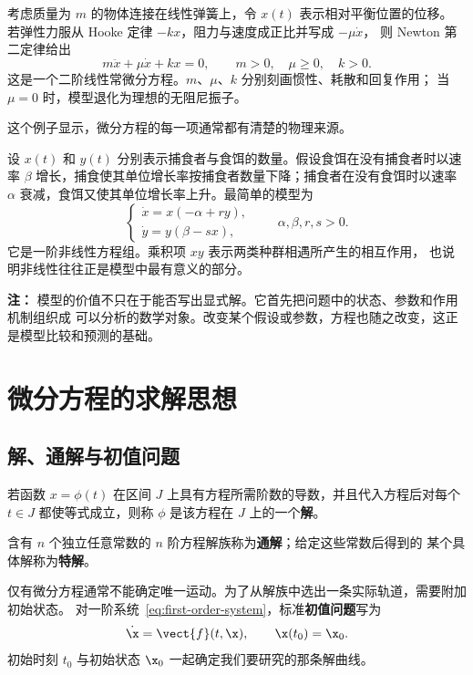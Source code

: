\begin{example}
考虑质量为 $m$ 的物体连接在线性弹簧上，令 $x(t)$ 表示相对平衡位置的位移。
若弹性力服从 Hooke 定律 $-kx$，阻力与速度成正比并写成 $-\mu\dot{x}$，
则 Newton 第二定律给出
\begin{equation}\label{eq:damped-oscillator}
	m\ddot{x}+\mu\dot{x}+kx=0,
	\qquad m>0,\quad \mu\geq 0,\quad k>0.
\end{equation}
这是一个二阶线性常微分方程。$m$、$\mu$、$k$ 分别刻画惯性、耗散和回复作用；
当 $\mu=0$ 时，模型退化为理想的无阻尼振子。
\end{example}

这个例子显示，微分方程的每一项通常都有清楚的物理来源。

\begin{example}
设 $x(t)$ 和 $y(t)$ 分别表示捕食者与食饵的数量。假设食饵在没有捕食者时以速率
$\beta$ 增长，捕食使其单位增长率按捕食者数量下降；捕食者在没有食饵时以速率
$\alpha$ 衰减，食饵又使其单位增长率上升。最简单的模型为
\[
	\begin{cases}
		\dot{x}=x(-\alpha+ry),\\
		\dot{y}=y(\beta-sx),
	\end{cases}
	\qquad \alpha,\beta,r,s>0.
\]
它是一阶非线性方程组。乘积项 $xy$ 表示两类种群相遇所产生的相互作用，
也说明非线性往往正是模型中最有意义的部分。
\end{example}

\textbf{注：}
模型的价值不只在于能否写出显式解。它首先把问题中的状态、参数和作用机制组织成
可以分析的数学对象。改变某个假设或参数，方程也随之改变，这正是模型比较和预测的基础。


\section{微分方程的求解思想}

\subsection*{解、通解与初值问题}

\begin{definition}
若函数 $x=\phi(t)$ 在区间 $J$ 上具有方程所需阶数的导数，并且代入方程后对每个
$t\in J$ 都使等式成立，则称 $\phi$ 是该方程在 $J$ 上的一个\textbf{解}。

含有 $n$ 个独立任意常数的 $n$ 阶方程解族称为\textbf{通解}；给定这些常数后得到的
某个具体解称为\textbf{特解}。
\end{definition}

仅有微分方程通常不能确定唯一运动。为了从解族中选出一条实际轨道，需要附加初始状态。
对一阶系统~\eqref{eq:first-order-system}，标准\textbf{初值问题}写为
\begin{equation}\label{eq:ivp}
	\dot{\x}=\vect{f}(t,\x),
	\qquad \x(t_0)=\x_0.
\end{equation}
初始时刻 $t_0$ 与初始状态 $\x_0$ 一起确定我们要研究的那条解曲线。

